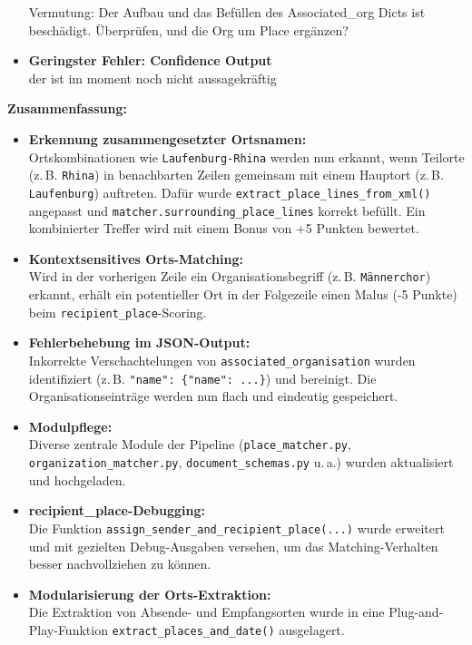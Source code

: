 \documentclass{article}
\begin{document}
\begin{itemize}
\begin{verbatim}
    \end{verbatim}
    Vermutung: Der Aufbau und das Befüllen des Associated\_org Dicts ist beschädigt. Überprüfen, und die Org um Place ergänzen?
     \item \textbf{Geringster Fehler: Confidence Output}\\ der ist im moment noch nicht aussagekräftig
    


\end{itemize}    

\vspace{0.5em}
\noindent\textbf{Zusammenfassung:}
\begin{itemize}
    \item \textbf{Erkennung zusammengesetzter Ortsnamen:} \\
    Ortskombinationen wie \texttt{Laufenburg-Rhina} werden nun erkannt, wenn Teilorte (z.\,B. \texttt{Rhina}) in benachbarten Zeilen gemeinsam mit einem Hauptort (z.\,B. \texttt{Laufenburg}) auftreten. Dafür wurde \texttt{extract\_place\_lines\_from\_xml()} angepasst und \texttt{matcher.surrounding\_place\_lines} korrekt befüllt. Ein kombinierter Treffer wird mit einem Bonus von +5 Punkten bewertet.
    
    \item \textbf{Kontextsensitives Orts-Matching:} \\
    Wird in der vorherigen Zeile ein Organisationsbegriff (z.\,B. \texttt{Männerchor}) erkannt, erhält ein potentieller Ort in der Folgezeile einen Malus (-5 Punkte) beim \texttt{recipient\_place}-Scoring.
    
    \item \textbf{Fehlerbehebung im JSON-Output:} \\
    Inkorrekte Verschachtelungen von \texttt{associated\_organisation} wurden identifiziert (z.\,B. \texttt{"name": \{"name": ...\}}) und bereinigt. Die Organisationseinträge werden nun flach und eindeutig gespeichert.
    
    \item \textbf{Modulpflege:} \\
    Diverse zentrale Module der Pipeline (\texttt{place\_matcher.py}, \texttt{organization\_matcher.py}, \texttt{document\_schemas.py} u.\,a.) wurden aktualisiert und hochgeladen.
    
    \item \textbf{recipient\_place-Debugging:} \\
    Die Funktion \texttt{assign\_sender\_and\_recipient\_place(...)} wurde erweitert und mit gezielten Debug-Ausgaben versehen, um das Matching-Verhalten besser nachvollziehen zu können.
    
    \item \textbf{Modularisierung der Orts-Extraktion:} \\
    Die Extraktion von Absende- und Empfangsorten wurde in eine Plug-and-Play-Funktion \texttt{extract\_places\_and\_date()} ausgelagert.
\end{itemize}
\end{document}
